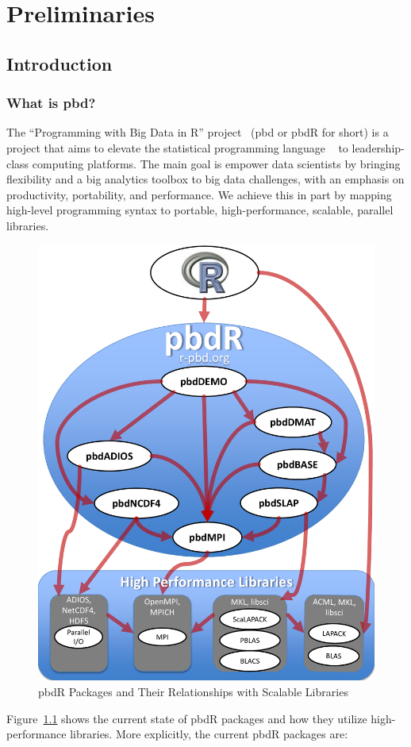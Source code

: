 \part{Preliminaries}




\chapter[Introduction]{Introduction}
\label{sec:introduction}


\section{What is pbd?}

The ``Programming with Big Data in R'' project~\citep{pbdR2012} (pbd or pbdR for short) is a project that aims to elevate the statistical programming language ~\citep{Rcore} to leadership-class computing platforms.  The main goal is empower data scientists by bringing flexibility and a big analytics toolbox to big data challenges, with an emphasis on productivity, portability, and performance.  We achieve this in part by mapping high-level programming syntax to portable, high-performance, scalable, parallel libraries.

\begin{figure}[t]
 \centering
 \includegraphics[scale=.45]{pbdDEMO-include/pics/pbdR}
 \caption{pbdR Packages and Their Relationships with Scalable Libraries}
 \label{fig:pbdrpackages}
\end{figure}
Figure~\ref{fig:pbdrpackages} shows the current state of pbdR packages and how they utilize high-performance libraries.  More explicitly, the current pbdR packages are:


